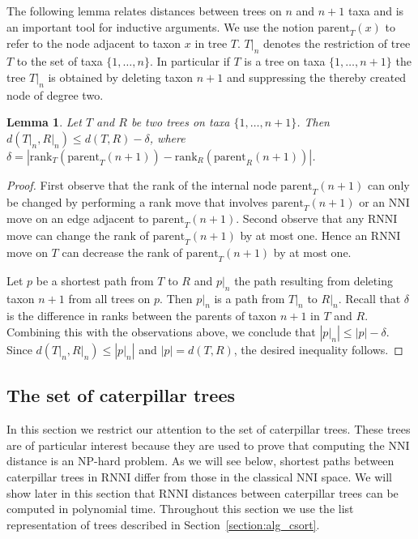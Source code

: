 \documentclass{amsart}
\newcommand{\parent}{\mathrm{parent}}
\newcommand{\rank}{\mathrm{rank}}
\newcommand{\nni}{\mathrm{NNI}}
\newcommand{\rnni}{\mathrm{RNNI}}
\newtheorem{lemma}[definition]{Lemma}
\begin{document}
The following lemma relates distances between trees on $n$ and $n+1$ taxa and is an important tool for inductive arguments.
We use the notion $\parent_T(x)$ to refer to the node adjacent to taxon $x$ in tree $T$.
$T{\big|}_n$ denotes the restriction of tree $T$ to the set of taxa $\{1, \ldots, n\}$.
In particular if $T$ is a tree on taxa $\{1, \ldots, n+1\}$ the tree $T{\big|}_n$ is obtained by deleting taxon $n+1$ and suppressing the thereby created node of degree two.

\begin{lemma}
Let $T$ and $R$ be two trees on taxa $\{1, \ldots, n+1\}$.
Then $d(T{\big|}_n, R{\big|}_n) \leq d(T,R) - \delta$, where $\delta = |\rank_T(\parent_T(n+1)) - \rank_R(\parent_R(n+1))|$.
\label{lemma:distance_delete_taxon}
\end{lemma}

\begin{proof}
First observe that the rank of the internal node $\parent_T(n+1)$ can only be changed by performing a rank move that involves $\parent_T(n+1)$ or an $\nni$ move on an edge adjacent to $\parent_T(n+1)$.
Second observe that any $\rnni$ move can change the rank of $\parent_T(n+1)$ by at most one.
Hence an $\rnni$ move on $T$ can decrease the rank of $\parent_T(n+1)$ by at most one.

Let $p$ be a shortest path from $T$ to $R$ and $p{\big|}_n$ the path resulting from deleting taxon $n+1$ from all trees on $p$.
Then $p{\big|}_n$ is a path from $T{\big|}_n$ to $R{\big|}_n$.
Recall that $\delta$ is the difference in ranks between the parents of taxon $n+1$ in $T$ and $R$.
Combining this with the observations above, we conclude that $|p{\big|}_n| \leq |p| - \delta$.
Since $d(T{\big|}_n,R{\big|}_n) \leq |p{\big|}_n|$ and $|p| = d(T,R)$, the desired inequality follows.
\end{proof}


\subsection{The set of caterpillar trees}
\label{section:caterpillar_convex}

In this section we restrict our attention to the set of caterpillar trees.
These trees are of particular interest because they are used to prove that computing the $\nni$ distance is an NP-hard problem.
As we will see below, shortest paths between caterpillar trees in $\rnni$ differ from those in the classical $\nni$ space.
We will show later in this section that $\rnni$ distances between caterpillar trees can be computed in polynomial time.
Throughout this section we use the list representation of trees described in Section~\ref{section:alg_csort}.
\end{document}
